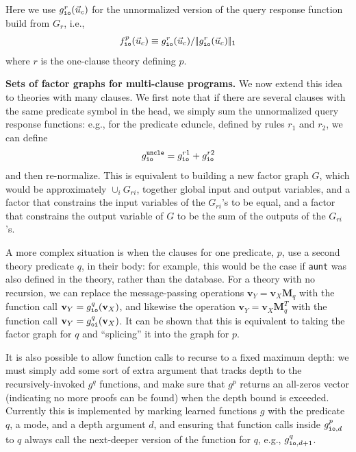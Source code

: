 \documentclass{article}
\newcommand{\cd}[1]{{\small \texttt{#1}}}
\newcommand{\mysubsection}[1]{\textbf{{#1}.}}
\newcommand{\vek}[1]{\textbf{#1}}
\newcommand{\M}{\textbf{M}}
\newcommand{\onenorm}[1]{{|\!|{#1}|\!|_1}}
\begin{document}
Here we use $g^r_\cd{io}(\vec{u}_c)$ for the unnormalized version of
the query response function build from $G_r$, i.e.,
\[ f^p_\cd{io}(\vec{u}_c) \equiv  g^r_\cd{io}(\vec{u}_c)/\onenorm{g^r_\cd{io}(\vec{u}_c)} 
\]
where $r$ is the one-clause theory defining $p$.  

\mysubsection{Sets of factor graphs for multi-clause programs} \label{sec:multi-clause}
We now extend this idea to theories with many clauses.  We first note
that if there are several clauses with the same predicate symbol in
the head, we simply sum the unnormalized query response functions:
e.g., for the predicate cd{uncle}, defined by rules $r_1$ and $r_2$,
we can define
\[ g^\cd{uncle}_\cd{io} = g^{r1}_\cd{io} +  g^{r2}_\cd{io}
\]
and then re-normalize.  This is equivalent to building a new factor
graph $G$, which would be approximately $\cup_i G_{ri}$, together
global input and output variables, and a factor that constrains the
input variables of the $G_{ri}$'s to be equal, and a factor that
constrains the output variable of $G$ to be the sum of the outputs of
the $G_{ri}$'s.


A more complex situation is when the clauses for one predicate, $p$,
use a second theory predicate $q$, in their body: for example, this
would be the case if \cd{aunt} was also defined in the theory, rather
than the database.  For a theory with no recursion, we can replace the
message-passing operations $\vek{v}_Y = \vek{v}_X \M_q$ with the
function call $\vek{v}_Y = g^q_\cd{io}(\vek{v}_X)$, and likewise the
operation $\vek{v}_Y = \vek{v}_X \M_q^T$ with the function call
$\vek{v}_Y = g^q_\cd{oi}(\vek{v}_X)$.  It can be shown that this is
equivalent to taking the factor graph for $q$ and ``splicing'' it into
the graph for $p$.

It is also possible to allow function calls to recurse to a fixed
maximum depth: we must simply add some sort of extra argument that
tracks depth to the recursively-invoked $g^q$ functions, and make sure
that $g^p$ returns an all-zeros vector (indicating no more proofs can
be found) when the depth bound is exceeded.  Currently this is
implemented by marking learned functions $g$ with the predicate $q$, a
mode, and a depth argument $d$, and ensuring that function calls
inside $g^p_{\cd{io},d}$ to $q$ always call the next-deeper version of
the function for $q$, e.g., $g^q_{\cd{io},d+1}$.
\end{document}

